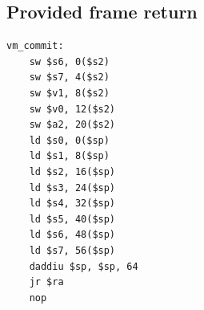 \subsection{Provided frame return}
\begin{verbatim}
vm_commit:
    sw $s6, 0($s2)
    sw $s7, 4($s2)
    sw $v1, 8($s2)
    sw $v0, 12($s2)
    sw $a2, 20($s2)
    ld $s0, 0($sp)
    ld $s1, 8($sp)
    ld $s2, 16($sp)
    ld $s3, 24($sp)
    ld $s4, 32($sp)
    ld $s5, 40($sp)
    ld $s6, 48($sp)
    ld $s7, 56($sp)
    daddiu $sp, $sp, 64
    jr $ra
    nop
\end{verbatim}
